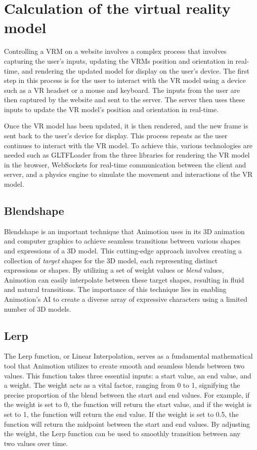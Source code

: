 \section{Calculation of the virtual reality model} 
Controlling a VRM on a website involves a complex process that involves 
capturing the user's inputs, updating the VRMs position and orientation in real-time, 
and rendering the updated model for display on the user's device.
The first step in this process is for the user to interact with the VR model 
using a device such as a VR headset or a mouse and keyboard. The inputs from the 
user are then captured by the website and sent to the server. The server then 
uses these inputs to update the VR model's position and orientation in real-time. 

Once the VR model has been updated, it is then rendered, and the new frame is 
sent back to the user's device for display. This process repeats as the user 
continues to interact with the VR model. 
To achieve this, various technologies are needed such as GLTFLoader from the three
libraries for rendering the VR model in the browser, WebSockets for real-time 
communication between the client and server, and a physics engine to simulate 
the movement and interactions of the VR model. 

\subsection{Blendshape}
Blendshape is an important technique that Animotion uses in its 3D animation and computer graphics to 
achieve seamless transitions between various shapes and expressions of a 3D model. This cutting-edge approach 
involves creating a collection of \emph{target} shapes for the 3D model, each representing distinct 
expressions or shapes. By utilizing a set of weight values or \emph{blend} values, Animotion can easily 
interpolate between these target shapes, resulting in fluid and natural transitions. The importance of this technique 
lies in enabling Animotion's AI to create a diverse array of expressive characters using a limited number of 3D models.

\subsection{Lerp}
\label{sec:lerp}
The Lerp function, or Linear Interpolation, serves as a fundamental mathematical tool that Animotion 
utilizes to create smooth and seamless blends between two values. This function takes three essential 
inputs: a start value, an end value, and a weight. The weight acts as a vital factor, ranging from 0 to 1, 
signifying the precise proportion of the blend between the start and end values.
For example, if the weight is set to 0, the function will return the start 
value, and if the weight is set to 1, the function will return the end value. 
If the weight is set to 0.5, the function will return the midpoint between the 
start and end values. By adjusting the weight, the Lerp function can be used to 
smoothly transition between any two values over time.

